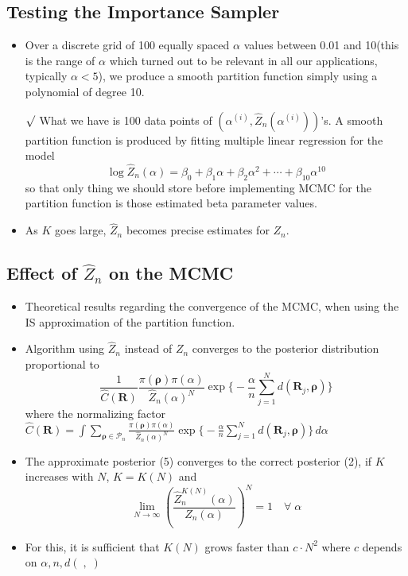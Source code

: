 \documentclass[12pt]{article}
\newcommand{\rmk}{$\surd$}
\begin{document}
\subsection{Testing the Importance Sampler}
\begin{itemize}
    \item Over a discrete grid of 100 equally spaced $\alpha$ values between 0.01 and 10(this is the range of $\alpha$ which turned out to be relevant in all our applications, typically $\alpha<5$), we produce a smooth partition function simply using a polynomial of degree 10.
    \item[\rmk] What we have is 100 data points of $(\alpha^{(i)}, \hat Z_n(\alpha^{(i)}))$'s. A smooth partition function is produced by fitting multiple linear regression for the model $$\log \hat Z_n(\alpha)=\beta_0+\beta_1 \alpha+\beta_2 \alpha^2+\cdots+\beta_{10} \alpha^{10}$$ so that only thing we should store before implementing MCMC for the partition function is those estimated beta parameter values.
    \item As $K$ goes large, $\hat{Z}_n$ becomes precise estimates for $Z_n$.  
\end{itemize}
\subsection{Effect of $\hat{Z}_n$ on the MCMC}
\begin{itemize}
    \item Theoretical results regarding the convergence of the MCMC, when using the IS approximation of the partition function.
    \item Algorithm using $\hat{Z}_n$ instead of $Z_n$ converges to the posterior distribution proportional to \begin{equation} \frac{1}{\hat{C}(\mathbf{R})}\frac{\pi(\boldsymbol{\rho})\pi(\alpha)}{\hat{Z}_n(\alpha)^N} \exp \big\{-\frac{\alpha}{n}\sum_{j=1}^N d(\mathbf{R}_j, \boldsymbol{\rho})\big\} \end{equation} where the normalizing factor $\hat{C}(\mathbf{R})=\int\sum_{\boldsymbol{\rho}\in \mathcal{P}_n}\frac{\pi(\boldsymbol{\rho})\pi(\alpha)}{\hat{Z}_n(\alpha)^N} \exp \big\{-\frac{\alpha}{n}\sum_{j=1}^N d(\mathbf{R}_j, \boldsymbol{\rho})\big\}\, d\alpha $
    \item The approximate posterior (5) converges to the correct posterior (2), if $K$ increases with $N$, $K=K(N)$ and $$\lim_{N \to \infty}(\frac{\hat{Z}_n^{K(N)}(\alpha)}{Z_n(\alpha)})^N =1 \quad \forall \; \alpha$$
    \item For this, it is sufficient that $K(N)$ grows faster than $c\cdot N^2$ where $c$ depends on $\alpha, n, d( \;,\; )$ 
\end{itemize}
\end{document}
